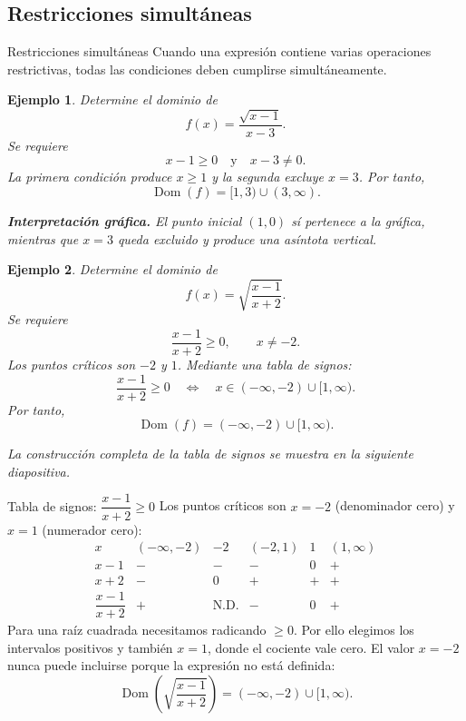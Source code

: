 \documentclass[aspectratio=169,10pt]{beamer}
\newtheorem{ejemplo}{Ejemplo}
\newcommand{\Dom}{\operatorname{Dom}}
\begin{document}
\subsection*{Restricciones simultáneas}
\begin{frame}{Restricciones simultáneas}
Cuando una expresión contiene varias operaciones restrictivas, todas las
condiciones deben cumplirse simultáneamente.

\begin{ejemplo}
Determine el dominio de
\[
f(x)=\frac{\sqrt{x-1}}{x-3}.
\]
Se requiere
\[
x-1\geq0
\quad\text{y}\quad
x-3\neq0.
\]
La primera condición produce $x\geq1$ y la segunda excluye $x=3$. Por tanto,
\[
\Dom(f)=[1,3)\cup(3,\infty).
\]

\textbf{Interpretación gráfica.} El punto inicial $(1,0)$ sí pertenece a la
gráfica, mientras que $x=3$ queda excluido y produce una asíntota vertical.
\begin{center}
\end{center}
\end{ejemplo}

\begin{ejemplo}
Determine el dominio de
\[
f(x)=\sqrt{\frac{x-1}{x+2}}.
\]
Se requiere
\[
\frac{x-1}{x+2}\geq0,
\qquad x\neq-2.
\]
Los puntos críticos son $-2$ y $1$. Mediante una tabla de signos:
\[
\frac{x-1}{x+2}\geq0
\quad\Longleftrightarrow\quad
x\in(-\infty,-2)\cup[1,\infty).
\]
Por tanto,
\[
\Dom(f)=(-\infty,-2)\cup[1,\infty).
\]

La construcción completa de la tabla de signos se muestra en la siguiente diapositiva.
\end{ejemplo}

\end{frame}

\begin{frame}{Tabla de signos: $\dfrac{x-1}{x+2}\ge0$}
Los puntos críticos son $x=-2$ (denominador cero) y $x=1$ (numerador cero):
\[
\begin{array}{c|ccccc}
x&(-\infty,-2)&-2&(-2,1)&1&(1,\infty)\\ \hline
x-1&-&-&-&0&+\\
x+2&-&0&+&+&+\\ \hline
\dfrac{x-1}{x+2}&+&\text{N.D.}&-&0&+
\end{array}
\]
Para una raíz cuadrada necesitamos radicando $\ge0$. Por ello elegimos los
intervalos positivos y también $x=1$, donde el cociente vale cero. El valor
$x=-2$ nunca puede incluirse porque la expresión no está definida:
\[
\boxed{\Dom\!\left(\sqrt{\frac{x-1}{x+2}}\right)=(-\infty,-2)\cup[1,\infty).}
\]
\end{frame}
\end{document}
